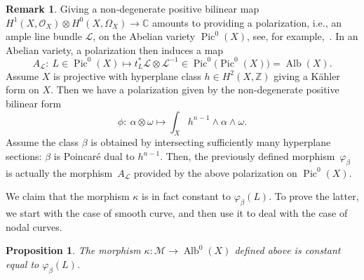 \documentclass[11pt]{article}
\numberwithin{equation}{section}
\newcommand{\Pic}{\operatorname{Pic}}
\newcommand{\Alb}{\operatorname{Alb}}
\newcommand{\ZZ}{\mathbb{Z}}
\newcommand{\CC}{\mathbb{C}}
\renewcommand{\L}{\mathcal{L}}
\newcommand{\M}{\mathcal{M}}
\renewcommand{\O}{\mathcal{O}}
\numberwithin{equation}{section}
\newtheorem{prop}[theo]{Proposition}
\theoremstyle{definition}
\newtheorem{remarkk}[theo]{Remark}
\begin{document}
\begin{remarkk}
Giving a non-degenerate positive bilinear map $H^1(X,\O_X)\otimes H^0(X,\Omega_X)\to\CC$ amounts to providing a polarization, i.e., an ample line bundle $\L$, on the Abelian variety $\Pic^0(X)$, see, for example,~\cite{mumford1974abelian}. In an Abelian variety, a polarization then induces a map
\[ A_\L\colon\ L\in\Pic^0(X)\longmapsto t_L^*\L\otimes \L^{-1}\in\Pic^0\bigl(\Pic^0(X)\bigr)=\Alb(X). \]
Assume $X$ is projective with hyperplane class $h\in H^2(X,\ZZ)$ giving a K\"ahler form on $X$. Then we have a polarization given by the non-degenerate positive bilinear form
\[ \phi\colon\ \alpha\otimes\omega\longmapsto \int_X h^{n-1}\wedge\alpha\wedge\omega. \]
Assume the class $\beta$ is obtained by intersecting sufficiently many hyperplane sections: $\beta$ is Poincar\'e dual to $h^{n-1}$. Then, the previously defined morphism~$\varphi_\beta$ is actually the morphism~$A_\L$ provided by the above polarization on $\Pic^0(X)$.
\end{remarkk}
We claim that the morphism $\kappa$ is in fact constant to $\varphi_\beta(L)$. To prove the latter, we start with the case of smooth curve, and then use it to deal with the case of nodal curves.

\begin{prop}\label{prop-image-of-L-is-constant}
The morphism $\kappa\colon\M\rightarrow \operatorname {Alb}^0(X)$ defined above is constant equal to $\varphi_\beta(L)$.
\end{prop}
\end{document}

